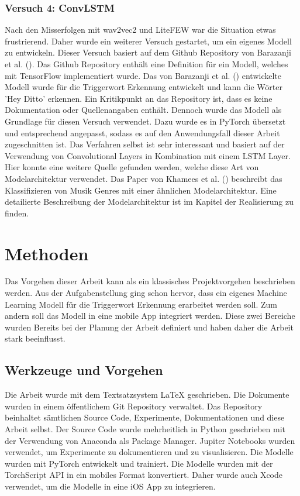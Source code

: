 \documentclass[11pt,a4paper]{article}
\begin{document}
\subsubsection{Versuch 4: ConvLSTM}
Nach den Misserfolgen mit wav2vec2 und LiteFEW war die Situation etwas frustrierend. Daher wurde 
ein weiterer Versuch gestartet, um ein eigenes Modell zu entwickeln. Dieser Versuch basiert auf 
dem Github Repository von Barazanji et al. (\cite{barazanji2023heyditto}). Das Github Repository 
enthält eine Definition für ein Modell, welches mit TensorFlow implementiert wurde. Das von 
Barazanji et al. (\cite{barazanji2023heyditto}) entwickelte Modell wurde für die Triggerwort 
Erkennung entwickelt und kann die Wörter 'Hey Ditto' erkennen. Ein Kritikpunkt an das Repository 
ist, dass es keine Dokumentation oder Quellenangaben enthält. Dennoch wurde das Modell als 
Grundlage für diesen Versuch verwendet. Dazu wurde es in PyTorch übersetzt und 
entsprechend angepasst, sodass es auf den Anwendungsfall dieser Arbeit zugeschnitten ist. 
Das Verfahren selbst ist sehr interessant und basiert auf der Verwendung von Convolutional Layers 
in Kombination mit einem LSTM Layer. Hier konnte eine weitere Quelle gefunden werden, welche 
diese Art von Modelarchitektur verwendet. Das Paper von Khamees et al. 
(\cite{khamees2021classifying}) beschreibt das Klassifizieren von Musik Genres mit einer 
ähnlichen Modelarchitektur. Eine detailierte Beschreibung der Modelarchitektur ist im Kapitel der 
Realisierung zu finden.

\newpage \section{Methoden}
Das Vorgehen dieser Arbeit kann als ein klassisches Projektvorgehen beschrieben werden. Aus der 
Aufgabenstellung ging schon hervor, dass ein eigenes Machine Learning Modell für die Triggerwort 
Erkennung erarbeitet werden soll. Zum andern soll das Modell in eine mobile App integriert werden.
Diese zwei Bereiche wurden Bereits bei der Planung der Arbeit definiert und haben daher die 
Arbeit stark beeinflusst.

\subsection{Werkzeuge und Vorgehen}
Die Arbeit wurde mit dem Textsatzsystem LaTeX geschrieben. Die Dokumente wurden in einem öffentlichem 
Git Repository verwaltet. Das Repository beinhaltet sämtlichen Source Code, Experimente, 
Dokumentationen und diese Arbeit selbst. Der Source Code wurde mehrheitlich in Python geschrieben 
mit der Verwendung von Anaconda als Package Manager. Jupiter Notebooks wurden verwendet, um 
Experimente zu dokumentieren und zu visualisieren. Die Modelle wurden mit PyTorch entwickelt und 
trainiert. Die Modelle wurden mit der TorchScript API in ein mobiles Format konvertiert. Daher 
wurde auch Xcode verwendet, um die Modelle in eine iOS App zu integrieren.
\end{document}
